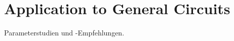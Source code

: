 
\chapter{Application to General Circuits}
\label{ch:application}
Parameterstudien und -Empfehlungen.